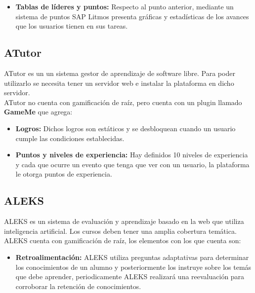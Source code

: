\begin{multicols*}{2}
\begin{itemize}
        \item {\bf Tablas de líderes y puntos: } Respecto al punto anterior,
        mediante un sistema de puntos SAP Litmos presenta gráficas y estadísticas
        de los avances que los usuarios tienen en sus tareas.

    \end{itemize}


\subsection*{ATutor}

 ATutor \cite{PagATutor} es un un sistema gestor de aprendizaje de software libre. Para poder
 utilizarlo se necesita tener un servidor web e instalar la plataforma en dicho servidor.\\

    \noindent ATutor no cuenta con gamificación de raíz,
    pero cuenta con un plugin llamado \textbf{GameMe} que agrega:

    \begin{itemize}
        \item {\bf Logros:} Dichos logros son estáticos y se
        desbloquean cuando un usuario cumple las condiciones
        establecidas.

        \item {\bf Puntos y niveles de experiencia:} Hay definidos 10
        niveles de experiencia y cada que ocurre un evento que tenga
        que ver con un usuario, la plataforma le otorga puntos de
        experiencia.

    \end{itemize}



\subsection*{ALEKS}

 ALEKS \cite{PagALEKS} es un sistema de evaluación y aprendizaje basado en la web que
 utiliza inteligencia artificial. Los cursos deben tener una amplia cobertura temática.\\

 \noindent ALEKS cuenta con gamificación de raíz, los elementos con los que cuenta son:

    \begin{itemize}
        \item {\bf Retroalimentación:} ALEKS utiliza preguntas adaptativas para
            determinar los conocimientos de un alumno y posteriormente los instruye
            sobre los temás que debe aprender, periodicamente ALEKS realizará una
            reevaluación para corroborar la retención de conocimientos.


\end{itemize}
\end{multicols*}
